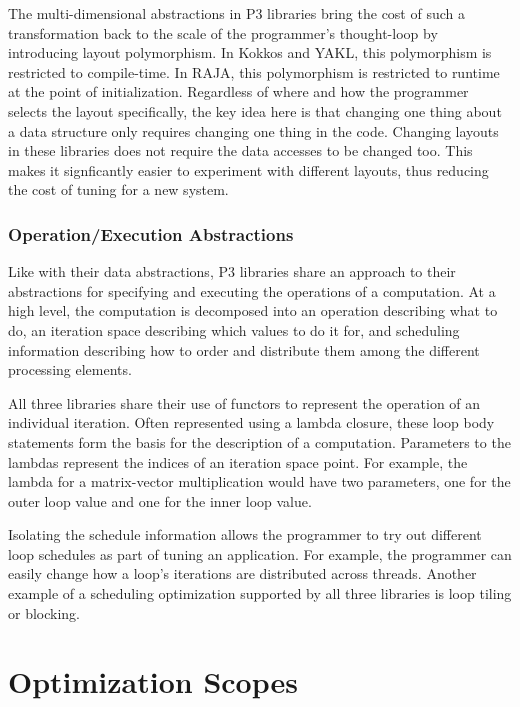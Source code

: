 The multi-dimensional abstractions in P3 libraries bring the cost of such a transformation back to the scale of the programmer's thought-loop by introducing layout polymorphism.
In Kokkos and YAKL, this polymorphism is restricted to compile-time.
In RAJA, this polymorphism is restricted to runtime at the point of initialization.
Regardless of where and how the programmer selects the layout specifically, the key idea here is that changing one thing about a data structure only requires changing one thing in the code.
Changing layouts in these libraries does not require the data accesses to be changed too.
This makes it signficantly easier to experiment with different layouts, thus reducing the cost of tuning for a new system.

\subsubsection{Operation/Execution Abstractions}

Like with their data abstractions, P3 libraries share an approach to their abstractions for specifying and executing the operations of a computation.
At a high level, the computation is decomposed into an operation describing what to do, an iteration space describing which values to do it for, and scheduling information describing how to order and distribute them among the different processing elements.

All three libraries share their use of functors to represent the operation of an individual iteration.
Often represented using a lambda closure, these loop body statements form the basis for the description of a computation.
Parameters to the lambdas represent the indices of an iteration space point. For example, the lambda for a matrix-vector multiplication would have two parameters, one for the outer loop value and one for the inner loop value.

Isolating the schedule information allows the programmer to try out different loop schedules as part of tuning an application.
For example, the programmer can easily change how a loop's iterations are distributed across threads.
Another example of a scheduling optimization supported by all three libraries is loop tiling or blocking.



\section{Optimization Scopes}

